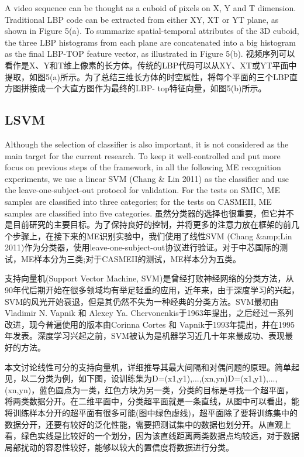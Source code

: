 A video sequence can be thought as a cuboid of pixels on X, Y and T dimension. Traditional LBP code can be extracted from either XY, XT or YT plane, as shown in Figure 5(a). To summarize spatial-temporal attributes of the 3D cuboid, the three LBP histograms from each plane are concatenated into a big histogram as the final LBP-TOP feature vector, as illustrated in Figure 5(b).
视频序列可以看作是X、Y和T维上像素的长方体。传统的LBP代码可以从XY、XT或YT平面中提取，如图5(a)所示。为了总结三维长方体的时空属性，将每个平面的三个LBP直方图拼接成一个大直方图作为最终的LBP- top特征向量，如图5(b)所示。


\subsection{LSVM}

Although the selection of classifier is also important, it is not considered as the main target for the current research. To keep it well-controlled and put more focus on previous steps of the framework, in all the following ME recognition experiments, we use a linear SVM (Chang \& Lin 2011) as the classifier and use the leave-one-subject-out protocol for validation. For the tests on SMIC, ME samples are classified into three categories; for the tests on CASMEII, ME samples are classified into five categories.
虽然分类器的选择也很重要，但它并不是目前研究的主要目标。为了保持良好的控制，并将更多的注意力放在框架的前几个步骤上，在接下来的ME识别实验中，我们使用了线性SVM (Chang \&amp;Lin 2011)作为分类器，使用leave-one-subject-out协议进行验证。对于中芯国际的测试，ME样本分为三类;对于CASMEII的测试，ME样本分为五类。

支持向量机(Support Vector Machine, SVM)是曾经打败神经网络的分类方法，从90年代后期开始在很多领域均有举足轻重的应用，近年来，由于深度学习的兴起，SVM的风光开始衰退，但是其仍然不失为一种经典的分类方法。SVM最初由 Vladimir N. Vapnik 和 Alexey Ya. Chervonenkis于1963年提出，之后经过一系列改进，现今普遍使用的版本由Corinna Cortes 和 Vapnik于1993年提出，并在1995年发表。深度学习兴起之前，SVM被认为是机器学习近几十年来最成功、表现最好的方法。

本文讨论线性可分的支持向量机，详细推导其最大间隔和对偶问题的原理。简单起见，以二分类为例，如下图，设训练集为D={(x1,y1),...,(xn,yn)}D={(x1,y1),...,(xn,yn)}，蓝色圆点为一类，红色方块为另一类，分类的目标是寻找一个超平面，将两类数据分开。在二维平面中，分类超平面就是一条直线，从图中可以看出，能将训练样本分开的超平面有很多可能(图中绿色虚线)，超平面除了要将训练集中的数据分开，还要有较好的泛化性能，需要把测试集中的数据也划分开。从直观上看，绿色实线是比较好的一个划分，因为该直线距离两类数据点均较远，对于数据局部扰动的容忍性较好，能够以较大的置信度将数据进行分类。


